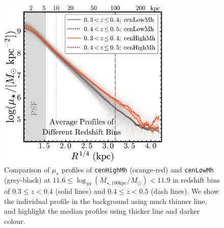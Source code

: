 \documentclass[a4paper,fleqn,usenatbib]{mnras}
\def\rbcg{\texttt{cenHighMh}}
\def\nbcg{\texttt{cenLowMh}}
\def\logmtot{{$\log_{10} (M_{\star,100\mathrm{kpc}}/M_{\odot})$}}
\def\mden{{$\mu_{\star}$}}
\begin{document}
\begin{figure}
    \centering 
    \includegraphics[width=8.2cm]{fig/redbcg_avg_prof_z}
    \caption{
        Comparison of \mden{} profiles of \rbcg{} (orange-red) and \nbcg{} 
        (grey-black) at $11.6 \le$\logmtot$< 11.9$ in redshift bins of 
        $0.3\leq z<0.4$ (solid lines) and $0.4\leq z<0.5$ (dash lines). 
        We show the individual profile in the background using much thinner line, 
        and highlight the median profiles using thicker line and darker colour.
        }
    \label{fig:avg_prof_z}
\end{figure}    
\end{document}
